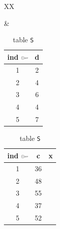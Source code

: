 \begin{frame}
\begin{table}[htbp]
\begin{tabularx}{\linewidth}{XX}
\begin{minipage}{\linewidth}
\begin{subtable}[b]{\linewidth}
    \end{subtable}
  \end{minipage}
  &
  \begin{minipage}{\linewidth}
    \begin{subtable}[b]{\linewidth}
     \centering
     \begin{tabular}{cc}
      \toprule
      \ttfamily ind \includegraphics[width=1em]{Bilder/Key} & \ttfamily d \\
      \midrule
      1 & 2 \\
      2 & 4 \\
      3 & 6 \\
      4 & 4 \\
      5 & 7 \\
      \bottomrule
     \end{tabular}
    \caption{table \texttt{T}}
    \end{subtable}
    \bigskip\bigskip
    
    \begin{subtable}[b]{\linewidth}
     \centering
     \begin{tabular}{ccc}
      \toprule
      \ttfamily ind \includegraphics[width=1em]{Bilder/Key} & \ttfamily c & \ttfamily x \\
      \midrule
      1 & 36 \\
      2 & 48 \\
      3 & 55 \\
      4 & 37 \\
      5 & 52 \\
      \bottomrule
     \end{tabular}
    \caption{table \texttt{S}}
    \end{subtable}
  \end{minipage}
 \end{tabularx}
\end{table}
\end{frame}

